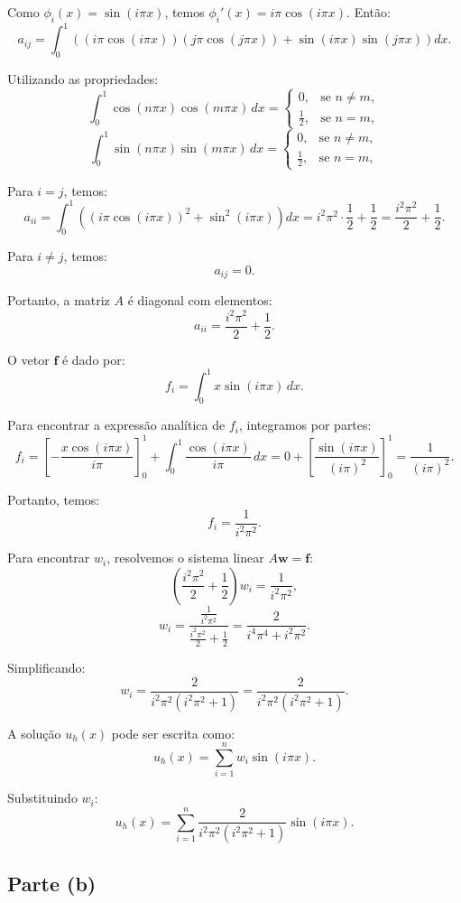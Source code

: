 \documentclass{article}
\begin{document}
Como \( \phi_i(x) = \sin(i \pi x) \), temos \( \phi_i'(x) = i \pi \cos(i \pi x) \). Então:
\[
a_{ij} = \int_0^1 \left( (i \pi \cos(i \pi x))(j \pi \cos(j \pi x)) + \sin(i \pi x) \sin(j \pi x) \right) dx.
\]

Utilizando as propriedades:
\[
\int_0^1 \cos(n\pi x) \cos(m\pi x) \, dx = \begin{cases}
0, & \text{se } n \neq m, \\
\frac{1}{2}, & \text{se } n = m,
\end{cases}
\]
\[
\int_0^1 \sin(n\pi x) \sin(m\pi x) \, dx = \begin{cases}
0, & \text{se } n \neq m, \\
\frac{1}{2}, & \text{se } n = m,
\end{cases}
\]

Para \( i = j \), temos:
\[
a_{ii} = \int_0^1 \left( (i \pi \cos(i \pi x))^2 + \sin^2(i \pi x) \right) dx = i^2 \pi^2 \cdot \frac{1}{2} + \frac{1}{2} = \frac{i^2 \pi^2}{2} + \frac{1}{2}.
\]

Para \( i \neq j \), temos:
\[
a_{ij} = 0.
\]

Portanto, a matriz \( A \) é diagonal com elementos:
\[
a_{ii} = \frac{i^2 \pi^2}{2} + \frac{1}{2}.
\]

O vetor \( \mathbf{f} \) é dado por:
\[
f_i = \int_0^1 x \sin(i \pi x) \, dx.
\]

Para encontrar a expressão analítica de \( f_i \), integramos por partes:
\[
f_i = \left[ -\frac{x \cos(i \pi x)}{i \pi} \right]_0^1 + \int_0^1 \frac{\cos(i \pi x)}{i \pi} \, dx = 0 + \left[ \frac{\sin(i \pi x)}{(i \pi)^2} \right]_0^1 = \frac{1}{(i \pi)^2}.
\]

Portanto, temos:
\[
f_i = \frac{1}{i^2 \pi^2}.
\]

Para encontrar \( w_i \), resolvemos o sistema linear \( A \mathbf{w} = \mathbf{f} \):
\[
\left( \frac{i^2 \pi^2}{2} + \frac{1}{2} \right) w_i = \frac{1}{i^2 \pi^2},
\]
\[
w_i = \frac{\frac{1}{i^2 \pi^2}}{\frac{i^2 \pi^2}{2} + \frac{1}{2}} = \frac{2}{i^4 \pi^4 + i^2 \pi^2}.
\]

Simplificando:
\[
w_i = \frac{2}{i^2 \pi^2 (i^2 \pi^2 + 1)} = \frac{2}{i^2 \pi^2 (i^2 \pi^2 + 1)}.
\]

A solução \( u_h(x) \) pode ser escrita como:
\[
u_h(x) = \sum_{i=1}^n w_i \sin(i \pi x).
\]

Substituindo \( w_i \):
\[
u_h(x) = \sum_{i=1}^n \frac{2}{i^2 \pi^2 (i^2 \pi^2 + 1)} \sin(i \pi x).
\]

\subsection{Parte (b)}
\end{document}

